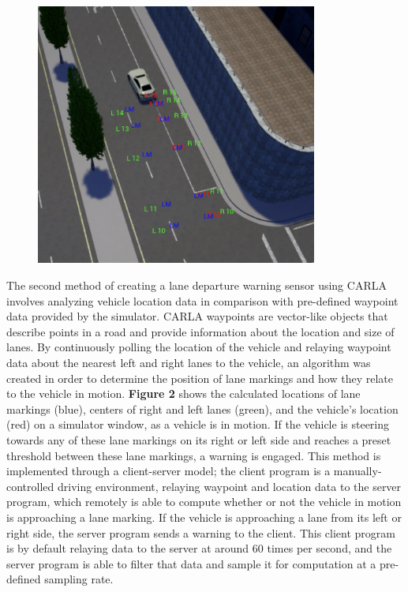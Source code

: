 \documentclass[12pt]{article}
\renewcommand{\_}{\kern-1.5pt\textunderscore\kern-1.5pt}
\begin{document}
\begin{figure}[H]
\centering
\advance\leftskip 0.0in		\includegraphics[width=3.65in,height=3.39in]{./media/image3.png}
\par
\vspace{\baselineskip}
\end{figure}



\vspace{\baselineskip}
The second method of creating a lane departure warning sensor using CARLA involves analyzing vehicle location data in comparison with pre-defined waypoint data provided by the simulator. CARLA waypoints are vector-like objects that describe points in a road and provide information about the location and size of lanes. By continuously polling the location of the vehicle and relaying waypoint data about the nearest left and right lanes to the vehicle, an algorithm was created in order to determine the position of lane markings and how they relate to the vehicle in motion. \textbf{Figure 2 }shows the calculated locations of lane markings (blue), centers of right and left lanes (green), and the vehicle’s location (red) on a simulator window, as a vehicle is in motion. If the vehicle is steering towards any of these lane markings on its right or left side and reaches a preset threshold between these lane markings, a warning is engaged. This method is implemented through a client-server model; the client program is a manually-controlled driving environment, relaying waypoint and location data to the server program, which remotely is able to compute whether or not the vehicle in motion is approaching a lane marking. If the vehicle is approaching a lane from its left or right side, the server program sends a warning to the client. This client program is by default relaying data to the server at around 60 times per second, and the server program is able to filter that data and sample it for computation at a pre-defined sampling rate.\par
\end{document}
